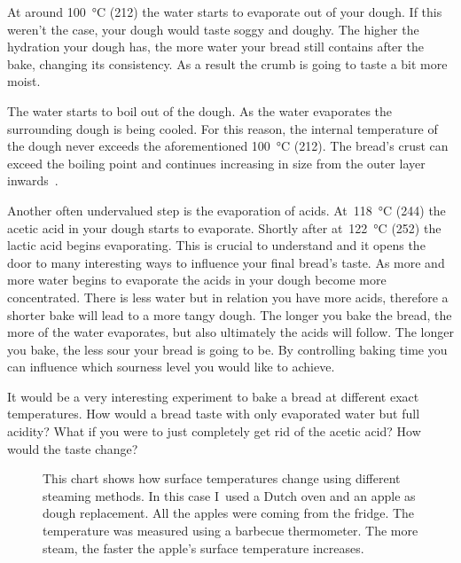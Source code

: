 At around  \qty{100}{\degreeCelsius} (\qty{212}{\degF}) the water starts to evaporate out of your
dough. If this weren't the case, your dough would taste soggy and
doughy. The higher the hydration your dough has, the more water your bread
still contains after the bake, changing its consistency.  As a result the
crumb is going to taste a bit more moist.

The water starts to boil out of the
dough. As the water evaporates the surrounding dough is being cooled.
For this reason, the internal temperature of the dough never exceeds the aforementioned
\qty{100}{\degreeCelsius} (\qty{212}{\degF}). The bread's crust can exceed the boiling point
and continues increasing in size from the outer layer inwards~\cite{bread+temperature+baking}.

Another often undervalued step is the evaporation of acids.
At~\qty{118}{\degreeCelsius} (\qty{244}{\degF}) the acetic acid in your dough
starts to evaporate.
Shortly after at~\qty{122}{\degreeCelsius} (\qty{252}{\degF}) the lactic acid begins evaporating.
This is crucial to understand and it opens the door to many interesting
ways to influence your final bread's taste. As more and more water
begins to evaporate the acids in your dough become more concentrated.
There is less water but in relation you have more acids, therefore a shorter
bake will lead to a more tangy dough. The longer you bake the bread,
the more of the water evaporates, but also ultimately the acids will follow.
The longer you bake, the less sour your bread is going to be. By controlling
baking time you can influence which sourness level you would like to achieve.

It would be a very interesting experiment to bake a bread at different exact
temperatures. How would a bread taste with only evaporated water but
full acidity? What if you were to just completely get rid of the acetic
acid? How would the taste change?

\begin{figure}[!htb]
  
  \caption[Surface temperature for different steaming methods]{This
      chart shows how surface temperatures change using different steaming
      methods. In this case I~used a Dutch oven and an apple as dough
      replacement. All the apples were coming from the fridge. The temperature
      was measured using a barbecue thermometer.  The more steam, the faster
      the apple's surface temperature increases.}
\end{figure}

